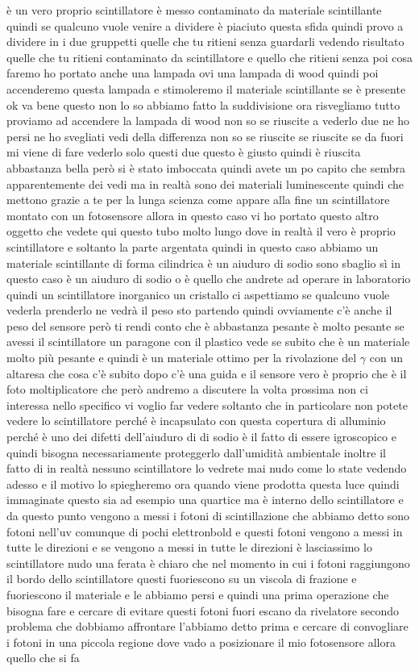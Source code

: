 {è un vero proprio scintillatore è messo contaminato da materiale scintillante quindi se qualcuno vuole venire a dividere è piaciuto questa sfida quindi provo a dividere in i due gruppetti quelle che tu ritieni senza guardarli vedendo risultato quelle che tu ritieni contaminato da scintillatore e quello che ritieni senza poi cosa faremo ho portato anche una lampada ovi una lampada di wood quindi poi accenderemo questa lampada e stimoleremo il materiale scintillante se è presente ok va bene questo non lo so abbiamo fatto la suddivisione ora risvegliamo tutto proviamo ad accendere la lampada di wood non so se riuscite a vederlo due ne ho persi ne ho svegliati vedi della differenza non so se riuscite se riuscite se da fuori mi viene di fare vederlo solo questi due questo è giusto quindi è riuscita abbastanza bella però si è stato imboccata quindi avete un po capito che sembra apparentemente dei vedi ma in realtà sono dei materiali luminescente quindi che mettono grazie a te per la lunga scienza come appare alla fine un scintillatore montato con un fotosensore allora in questo caso vi ho portato questo altro oggetto che vedete qui questo tubo molto lungo dove in realtà il vero è proprio scintillatore e soltanto la parte argentata quindi in questo caso abbiamo un materiale scintillante di forma cilindrica è un aiuduro di sodio sono sbaglio sì in questo caso è un aiuduro di sodio o è quello che andrete ad operare in laboratorio quindi un scintillatore inorganico un cristallo ci aspettiamo se qualcuno vuole vederla prenderlo ne vedrà il peso sto partendo quindi ovviamente c'è anche il peso del sensore però ti rendi conto che è abbastanza pesante è molto pesante se avessi il scintillatore un paragone con il plastico vede se subito che è un materiale molto più pesante e quindi è un materiale ottimo per la rivolazione del $\gamma$ con un altaresa che cosa c'è subito dopo c'è una guida e il sensore vero è proprio che è il foto moltiplicatore che però andremo a discutere la volta prossima non ci interessa nello specifico vi voglio far vedere soltanto che in particolare non potete vedere lo scintillatore perché è incapsulato con questa copertura di alluminio perché è uno dei difetti dell'aiuduro di di sodio è il fatto di essere igroscopico e quindi bisogna necessariamente proteggerlo dall'umidità ambientale inoltre il fatto di in realtà nessuno scintillatore lo vedrete mai nudo come lo state vedendo adesso e il motivo lo spiegheremo ora quando viene prodotta questa luce quindi immaginate questo sia ad esempio una quartice ma è interno dello scintillatore e da questo punto vengono a messi i fotoni di scintillazione che abbiamo detto sono fotoni nell'uv comunque di pochi elettronbold e questi fotoni vengono a messi in tutte le direzioni e se vengono a messi in tutte le direzioni è lasciassimo lo scintillatore nudo una ferata è chiaro che nel momento in cui i fotoni raggiungono il bordo dello scintillatore questi fuoriescono su un viscola di frazione e fuoriescono il materiale e le abbiamo persi e quindi una prima operazione che bisogna fare e cercare di evitare questi fotoni fuori escano da rivelatore secondo problema che dobbiamo affrontare l'abbiamo detto prima e cercare di convogliare i fotoni in una piccola regione dove vado a posizionare il mio fotosensore allora quello che si fa }
